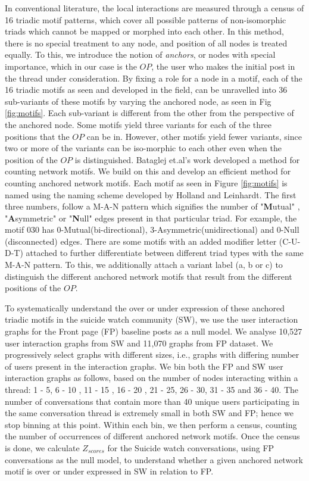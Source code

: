 In conventional literature, the local interactions are measured through a census of 16 triadic motif patterns\cite{faust20077}, which cover all possible patterns of non-isomorphic triads which cannot be mapped or morphed into each other. In this method, there is no special treatment to any node, and position of all nodes is treated equally. To this, we introduce the notion of \textit{anchors}, or nodes with special importance, which in our case is the $OP$, the user who makes the initial post in the thread under consideration. 
By fixing a role for a node in a motif, each of the 16 triadic motifs as seen and developed in the field\cite{faust20077, holland1977method}, can be unravelled into 36 sub-variants of these motifs by varying the anchored node, as seen in Fig \ref{fig:motifs}. Each sub-variant is different from the other from the perspective of the anchored node. Some motifs yield three variants for each of the three positions that the $OP$ can be in. However, other motifs yield fewer variants, since two or more of the variants can be iso-morphic to each other even when the position of the $OP$ is distinguished.  Bataglej et.al's work\cite{Batagelj2001} developed a method for counting network motifs. We build on this and develop an efficient method for counting anchored network motifs. 
Each motif as seen in Figure \ref{fig:motifs} is named using the naming scheme  developed by Holland and Leinhardt\cite{holland1974statistical}. The first three numbers, follow a M-A-N pattern which signifies the number of "\textbf{M}utual" , "\textbf{A}symmetric" or "\textbf{N}ull" edges present in that particular triad. For example, the motif 030 has 0-Mutual(bi-directional), 3-Asymmetric(unidirectional) and 0-Null (disconnected) edges. There are some motifs with an added modifier letter (C-U-D-T) attached to further differentiate between different triad types with the same M-A-N pattern.
To this, we additionally attach a variant label (a, b or c) to distinguish the different anchored network motifs that result from the different positions of the $OP$.


To systematically understand the over or under expression of these anchored triadic motifs in the suicide watch community (SW), we use the user interaction graphs for the Front page (FP) baseline posts as a null model. We analyse 10,527 user interaction graphs from SW and 11,070 graphs from FP dataset.
We progressively select graphs with different sizes, i.e., graphs with differing number of users present in the interaction graphs. We bin both the FP and SW user interaction graphs as follows, based on the number of nodes interacting within a thread: 1 - 5, 6 - 10 , 11 - 15 , 16 - 20 , 21 - 25, 26 - 30, 31 - 35 and 36 - 40. The number of conversations that contain more than 40 unique users participating in the same conversation thread is extremely small in both SW and FP; hence we stop binning at this point.
Within each bin, we then perform a census, counting the number of occurrences of different anchored network motifs. 
Once the census is done, we calculate $Z_{scores}$ for the Suicide watch conversations, using FP conversations as the null model, to understand whether a given anchored network motif is over or under expressed in SW in relation to FP.


